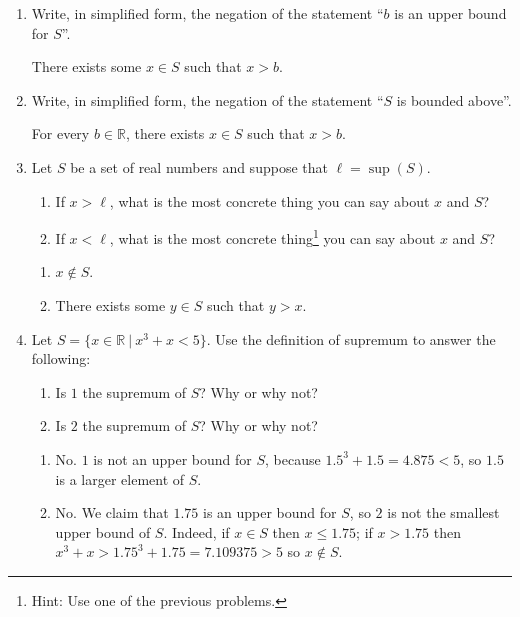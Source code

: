 \documentclass[12pt]{amsart}
\newcommand{\R}{{\mathbb{R}}}
\numberwithin{equation}{section}
\theoremstyle{plain} %
\theoremstyle{definition}
\theoremstyle{remark}
\begin{document}
\begin{enumerate}
\item Write, in simplified form, the negation of the statement ``$b$ is an upper bound for $S$''.

\begin{framed}
There exists some $x\in S$ such that $x>b$.
\end{framed}

\item Write, in simplified form, the negation of the statement ``$S$ is bounded above''.

\begin{framed}
For every $b\in \R$, there exists $x\in S$ such that $x>b$.
\end{framed}


\item Let $S$ be a set of real numbers and suppose that $\ell=\sup(S)$. 
\begin{enumerate}
\item If $x > \ell$, what is the most concrete thing you can say about $x$ and $S$?
\item If $x < \ell$, what is the most concrete thing\footnote{Hint: Use one of the previous problems.} you can say about $x$ and $S$?
\end{enumerate}


\begin{framed}
\begin{enumerate}
\item $x\notin S$.
\item There exists some $y\in S$ such that $y > x$.
\end{enumerate}
\end{framed}

\item Let $S=\{x\in \R \ | \ x^3 + x < 5\}$. Use the definition of supremum to answer the following:
\begin{enumerate}
\item Is $1$ the supremum of $S$? Why or why not?
\item Is $2$ the supremum of $S$? Why or why not?
\end{enumerate}

\begin{framed}
\begin{enumerate}
\item No. $1$ is not an upper bound for $S$, because $1.5^3 + 1.5 = 4.875 <5$, so $1.5$ is a larger element of $S$.
\item No. We claim that $1.75$ is an upper bound for $S$, so $2$ is not the smallest upper bound of $S$. Indeed, if $x\in S$ then $x\leq 1.75$;  if $x>1.75$ then $x^3+x > 1.75^3 + 1.75 = 7.109375 > 5$ so $x\notin S$.
\end{enumerate}
\end{framed}


\end{enumerate}
\end{document}
